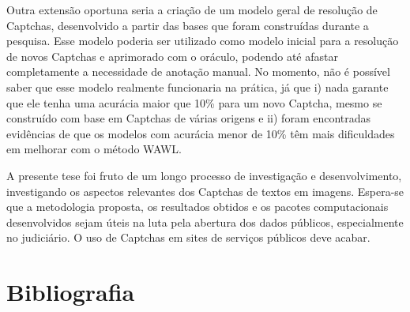 \documentclass[12pt,twoside,brazilian]{book}
\begin{document}
Outra extensão oportuna seria a criação de um modelo geral de resolução
de Captchas, desenvolvido a partir das bases que foram construídas
durante a pesquisa. Esse modelo poderia ser utilizado como modelo
inicial para a resolução de novos Captchas e aprimorado com o oráculo,
podendo até afastar completamente a necessidade de anotação manual. No
momento, não é possível saber que esse modelo realmente funcionaria na
prática, já que i) nada garante que ele tenha uma acurácia maior que
10\% para um novo Captcha, mesmo se construído com base em Captchas de
várias origens e ii) foram encontradas evidências de que os modelos com
acurácia menor de 10\% têm mais dificuldades em melhorar com o método
WAWL.

A presente tese foi fruto de um longo processo de investigação e
desenvolvimento, investigando os aspectos relevantes dos Captchas de
textos em imagens. Espera-se que a metodologia proposta, os resultados
obtidos e os pacotes computacionais desenvolvidos sejam úteis na luta
pela abertura dos dados públicos, especialmente no judiciário. O uso de
Captchas em sites de serviços públicos deve acabar.


\hypertarget{bibliografia}{%
\chapter*{Bibliografia}\label{bibliografia}}

\end{document}
